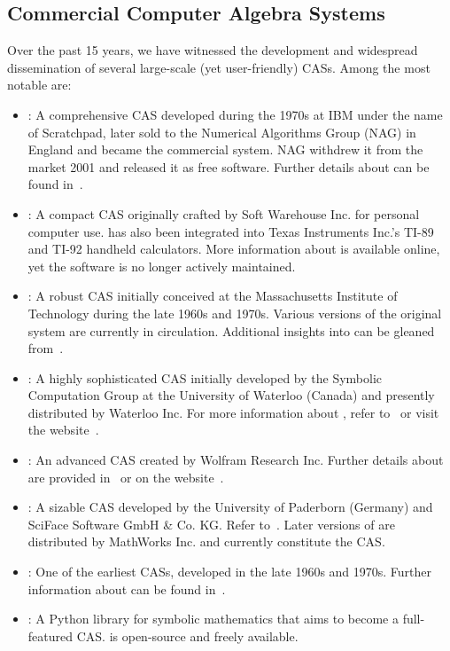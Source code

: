 \subsection{Commercial Computer Algebra Systems}

Over the past 15 years, we have witnessed the development and widespread dissemination of several large-scale (yet user-friendly) \acp{CAS}. Among the most notable are:
%
\begin{itemize}
  \setlength{\itemsep}{0.0em}
  \item \Axiom{}: A comprehensive \ac{CAS} developed during the 1970s at IBM under the name of Scratchpad, later sold to the Numerical Algorithms Group (NAG) in England and became the \Axiom{} commercial system. NAG withdrew it from the market 2001 and released it as free software. Further details about \Axiom{} can be found in~\cite{jenks1992axiom}.
  \item \Derive{}: A compact \ac{CAS} originally crafted by Soft Warehouse Inc. for personal computer use. \Derive{} has also been integrated into Texas Instruments Inc.'s TI-89 and TI-92 handheld calculators. More information about \Derive{} is available online, yet the software is no longer actively maintained.
  \item \Macsyma{}: A robust \ac{CAS} initially conceived at the Massachusetts Institute of Technology during the late 1960s and 1970s. Various versions of the original \Macsyma{} system are currently in circulation. Additional insights into \Macsyma{} can be gleaned from~\cite{wester1999computer}.
  \item \Maple{}: A highly sophisticated \ac{CAS} initially developed by the Symbolic Computation Group at the University of Waterloo (Canada) and presently distributed by Waterloo \Maple{} Inc. For more information about \Maple{}, refer to~\cite{heck2003introduction} or visit the website~\cite{maple}.
  \item \Mathematica{}: An advanced \ac{CAS} created by Wolfram Research Inc. Further details about \Mathematica{} are provided in~\cite{wolfram2003mathematica} or on the website~\cite{mathematica}.
  \item \MuPAD{}: A sizable \ac{CAS} developed by the University of Paderborn (Germany) and SciFace Software GmbH \& Co. KG. Refer to~\cite{creutzig2004mupad}. Later versions of \MuPAD{} are distributed by MathWorks Inc. and currently constitute the \Matlab{} \ac{CAS}.
  \item \Reduce{}: One of the earliest \acp{CAS}, developed in the late 1960s and 1970s. Further information about \Reduce{} can be found in~\cite{rayna1987reduce}.
  \item \SymPy{}: A Python library for symbolic mathematics that aims to become a full-featured \ac{CAS}. \SymPy{} is open-source and freely available.
\end{itemize}
